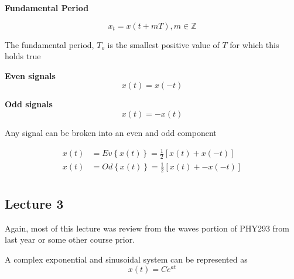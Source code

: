 \documentclass[10pt]{article}
\begin{document}
\begin{definition}
	\textbf{Fundamental Period} 


	\begin{equation}
		x_t = x(t+ mT), m \in \mathbb{Z}
		\label{eq:355:fundamental_period}
	\end{equation}

	The fundamental period, $ T_o $  is the smallest positive value of $ T $ for which this holds true
\end{definition}

\begin{definition}
	\textbf{Even signals} 
	\begin{equation}
		x(t) = x(-t)
		\label{eq:355:even_signal}
	\end{equation}
\end{definition}

\begin{definition}
	\textbf{Odd signals} 
	\begin{equation}
		x(t) = -x(t)
		\label{eq:355:odd_signal}
	\end{equation}
\end{definition}


\begin{theorem}
	Any signal can be broken into an even and odd component

	\begin{equation}
		\begin{split}
			x(t) &= Ev \left\{ x(t) \right\} = \frac{1}{2} \left[ x(t) + x(-t) \right]  \\
			x(t) &= Od \left\{ x(t) \right\} = \frac{1}{2} \left[ x(t) + -x(-t) \right]  \\
		\end{split}
		\label{eq:355:even_odd_decomposition}
	\end{equation}
\end{theorem}


\subsection{Lecture 3}

Again, most of this lecture was review from the waves portion of PHY293 from last year or some other course prior.



A complex exponential and sinusoidal system can be represented as 
\begin{equation}
	x(t) = C e^{at}
\end{equation}
\end{document}

